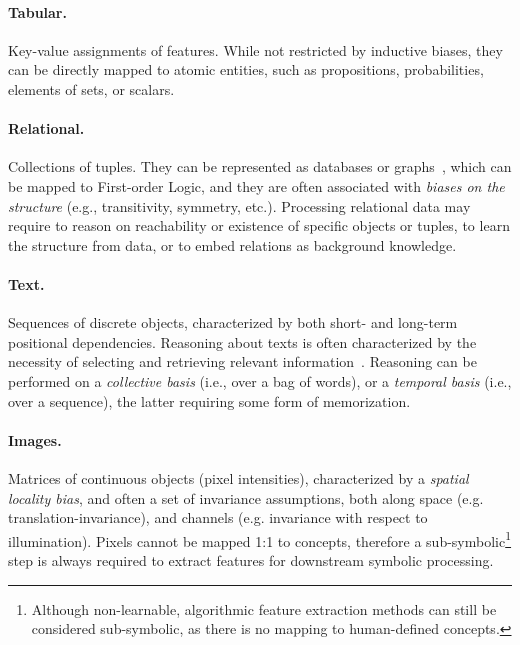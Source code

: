 \paragraph{Tabular.} Key-value assignments of features. While not restricted by inductive biases, they can be directly mapped to atomic entities, such as propositions, probabilities, elements of sets, or scalars.

\paragraph{Relational.} Collections of tuples. They can be represented as databases or graphs~\cite{delong2023neurosymbolic}, which can be mapped to First-order Logic, and they are often associated with \textit{biases on the structure} (e.g., transitivity, symmetry, etc.). Processing relational data may require to reason on reachability or existence of specific objects or tuples, to learn the structure from data, or to embed relations as background knowledge.

\paragraph{Text.} Sequences of discrete objects, characterized by both short- and long-term positional dependencies. %
Reasoning about texts is often characterized by the necessity of selecting and retrieving relevant information~\cite{hamilton2022neuro}. Reasoning can be performed on a \textit{collective basis} (i.e., over a bag of words), or a \textit{temporal basis} (i.e., over a sequence), the latter requiring some form of memorization.

\paragraph{Images.} Matrices of continuous objects (pixel intensities), characterized by a \textit{spatial locality bias}, and often a set of invariance assumptions, both along space (e.g. translation-invariance), and channels (e.g. invariance with respect to illumination). Pixels cannot be mapped 1:1 to concepts, therefore a sub-symbolic\footnote{Although non-learnable, algorithmic feature extraction methods can still be considered sub-symbolic, as there is no mapping to human-defined concepts.} step is always required to extract features for downstream symbolic processing. %

